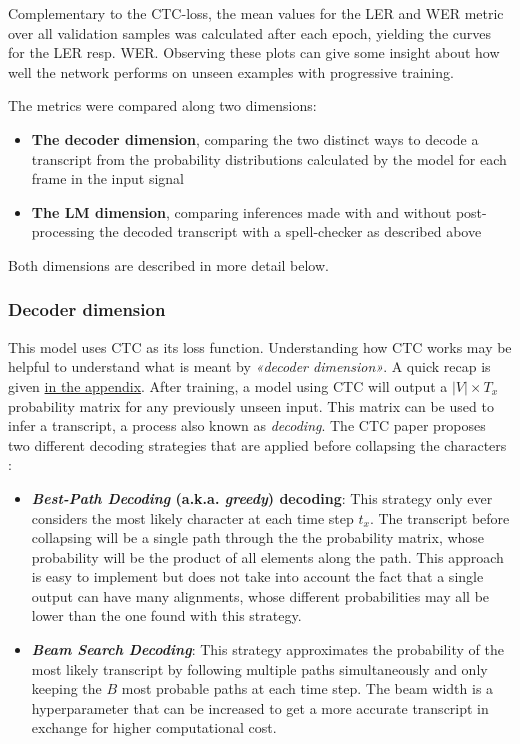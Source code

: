 Complementary to the \ac{CTC}-loss, the mean values for the \ac{LER} and \ac{WER} metric over all validation samples was calculated after each epoch, yielding the curves for the \ac{LER} resp. \ac{WER}. Observing these plots can give some insight about how well the network performs on unseen examples with progressive training.

The metrics were compared along two dimensions:

\begin{itemize}
	\item \textbf{The decoder dimension}, comparing the two distinct ways to decode a transcript from the probability distributions calculated by the model for each frame in the input signal
	\item \textbf{The LM dimension}, comparing inferences made with and without post-processing the decoded transcript with a spell-checker as described above
\end{itemize}

Both dimensions are described in more detail below.

\subsubsection{Decoder dimension}

This model uses \ac{CTC} as its loss function. Understanding how \ac{CTC} works may be helpful to understand what is meant by \textit{«decoder dimension»}. A quick recap is given \hyperref[ctc-summary]{in the appendix}. After training, a model using \ac{CTC} will output a $|V| \times T_x$ probability matrix for any previously unseen input. This matrix can be used to infer a transcript, a process also known as \textit{decoding}. The \ac{CTC} paper proposes two different decoding strategies that are applied before collapsing the characters \parencite{ctc_paper}:

\begin{itemize}
	\item \textbf{\textit{Best-Path Decoding} (a.k.a. \textit{greedy}) decoding}: This strategy only ever considers the most likely character at each time step $t_x$. The transcript before collapsing will be a single path through the the probability matrix, whose probability will be the product of all elements along the path. This approach is easy to implement but does not take into account the fact that a single output can have many alignments, whose different probabilities may all be lower than the one found with this strategy.
	\item \textbf{\textit{Beam Search Decoding}}: This strategy approximates the probability of the most likely transcript by following multiple paths simultaneously and only keeping the $B$ most probable paths at each time step. The beam width is a hyperparameter that can be increased to get a more accurate transcript in exchange for higher computational cost.
\end{itemize}

